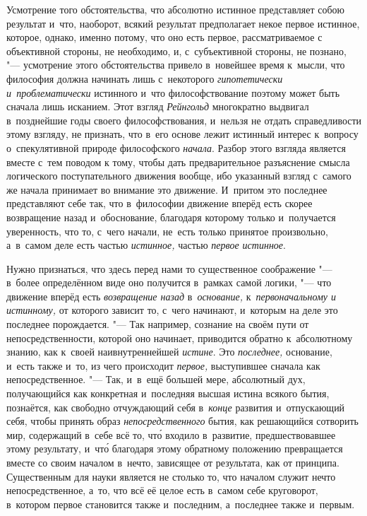 Усмотрение того обстоятельства, что абсолютно истинное представляет собою
результат и~что, наоборот, всякий результат предполагает некое первое истинное,
которое, однако, именно потому, что оно есть первое, рассматриваемое с
объективной стороны, не необходимо, и, с~субъективной стороны, не познано, "---
усмотрение этого обстоятельства привело в~новейшее время к~мысли, что философия
должна начинать лишь с~некоторого {\em гипотетически и~проблематически}
истинного и~что философствование поэтому может быть сначала лишь исканием. Этот
взгляд {\em Рейнгольд} многократно выдвигал в~позднейшие годы своего
философствования, и~нельзя не отдать справедливости этому взгляду, не признать,
что в~его основе лежит истинный интерес к~вопросу о~спекулятивной природе
философского {\em начала}. Разбор этого взгляда является вместе с~тем поводом к
тому, чтобы дать предварительное разъяснение смысла логического поступательного
движения вообще, ибо указанный взгляд с~самого же начала принимает во внимание
это движение. И~притом это последнее представляют себе так, что в~философии
движение вперёд есть скорее возвращение назад и~обоснование, благодаря которому
только и~получается уверенность, что то, с~чего начали, не~есть только принятое
произвольно, а~в~самом деле есть частью {\em истинное,} частью
{\em первое истинное}.

Нужно признаться, что здесь перед нами то существенное соображение "--- в~более
определённом виде оно получится в~рамках самой логики, "--- что движение вперёд
есть {\em возвращение назад} в~{\em основание,} к~{\em первоначальному и
истинному,} от которого зависит то, с~чего начинают, и~которым на деле это
последнее порождается. "--- Так например, сознание на своём пути от
непосредственности, которой оно начинает, приводится обратно к~абсолютному
знанию, как к~своей наивнутреннейшей {\em истине}. Это {\em последнее,}
основание, и~есть также и~то, из чего происходит {\em первое,} выступившее
сначала как непосредственное. "--- Так, и~в~ещё большей мере, абсолютный дух,
получающийся как конкретная и~последняя высшая истина всякого бытия, познаётся,
как свободно отчуждающий себя в~{\em конце} развития и~отпускающий себя, чтобы
принять образ {\em непосредственного} бытия, как решающийся сотворить мир,
содержащий в~себе всё то, чт\'{о} входило в~развитие, предшествовавшее этому
результату, и~чт\'{о} благодаря этому обратному положению превращается вместе
со своим началом в~нечто, зависящее от результата, как от принципа.
Существенным для науки является не столько то, что началом служит нечто
непосредственное, а~то, что всё её целое есть в~самом себе круговорот,
в~котором первое становится также и~последним, а~последнее также и~первым.

